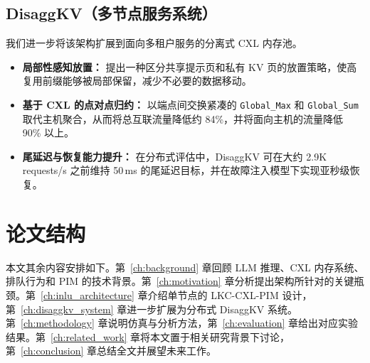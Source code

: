 \subsection{DisaggKV（多节点服务系统）}
我们进一步将该架构扩展到面向多租户服务的分离式 CXL 内存池。
\begin{itemize}
    \item \textbf{局部性感知放置：} 提出一种区分共享提示页和私有 KV 页的放置策略，使高复用前缀能够被局部保留，减少不必要的数据移动。
    \item \textbf{基于 CXL 的点对点归约：} 以端点间交换紧凑的 \texttt{Global\_Max} 和 \texttt{Global\_Sum} 取代主机聚合，从而将总互联流量降低约 84\%，并将面向主机的流量降低 90\% 以上。
    \item \textbf{尾延迟与恢复能力提升：} 在分布式评估中，DisaggKV 可在大约 2.9K requests/s 之前维持 50\,ms 的尾延迟目标，并在故障注入模型下实现亚秒级恢复。
\end{itemize}

\section{论文结构}
本文其余内容安排如下。第~\ref{ch:background} 章回顾 LLM 推理、CXL 内存系统、排队行为和 PIM 的技术背景。第~\ref{ch:motivation} 章分析提出架构所针对的关键瓶颈。第~\ref{ch:inlu_architecture} 章介绍单节点的 LKC-CXL-PIM 设计，第~\ref{ch:disaggkv_system} 章进一步扩展为分布式 DisaggKV 系统。第~\ref{ch:methodology} 章说明仿真与分析方法，第~\ref{ch:evaluation} 章给出对应实验结果。第~\ref{ch:related_work} 章将本文置于相关研究背景下讨论，第~\ref{ch:conclusion} 章总结全文并展望未来工作。
